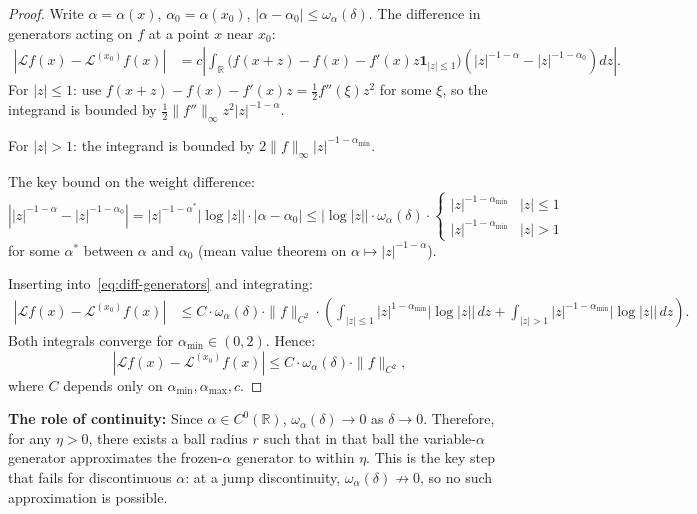 \documentclass{amsart}
\theoremstyle{definition}
\begin{document}
\begin{proof}
Write $\alpha = \alpha(x)$, $\alpha_0 = \alpha(x_0)$, $|\alpha - \alpha_0| \leq \omega_\alpha(\delta)$.
The difference in generators acting on $f$ at a point $x$ near $x_0$:
\begin{align}
    \left|\mathcal{L} f(x) - \mathcal{L}^{(x_0)} f(x)\right|
    &= c \left|\int_\mathbb{R} \bigl(f(x+z)-f(x)-f'(x)z\mathbf{1}_{|z|\leq 1}\bigr)
       \left(|z|^{-1-\alpha} - |z|^{-1-\alpha_0}\right)dz\right|.
    \label{eq:diff-generators}
\end{align}
For $|z| \leq 1$: use $f(x+z) - f(x) - f'(x)z = \frac{1}{2}f''(\xi)z^2$ for some $\xi$,
so the integrand is bounded by $\frac{1}{2}\|f''\|_\infty z^2 |z|^{-1-\alpha}$.

For $|z| > 1$: the integrand is bounded by $2\|f\|_\infty |z|^{-1-\alpha_{\min}}$.

The key bound on the weight difference:
\begin{equation}
    \left||z|^{-1-\alpha} - |z|^{-1-\alpha_0}\right|
    = |z|^{-1-\alpha^*} |\log|z|| \cdot |\alpha - \alpha_0|
    \leq |\log|z|| \cdot \omega_\alpha(\delta) \cdot
    \begin{cases} |z|^{-1-\alpha_{\min}} & |z| \leq 1 \\ |z|^{-1-\alpha_{\min}} & |z| > 1 \end{cases}
\end{equation}
for some $\alpha^*$ between $\alpha$ and $\alpha_0$ (mean value theorem on $\alpha \mapsto |z|^{-1-\alpha}$).

Inserting into~\eqref{eq:diff-generators} and integrating:
\begin{align*}
    \left|\mathcal{L} f(x) - \mathcal{L}^{(x_0)} f(x)\right|
    &\leq C \cdot \omega_\alpha(\delta) \cdot \|f\|_{C^2}
       \cdot \left(\int_{|z|\leq 1} |z|^{1-\alpha_{\min}}|\log|z||\,dz
             + \int_{|z|>1} |z|^{-1-\alpha_{\min}}|\log|z||\,dz\right).
\end{align*}
Both integrals converge for $\alpha_{\min} \in (0,2)$. Hence:
\begin{equation}
    \left|\mathcal{L} f(x) - \mathcal{L}^{(x_0)} f(x)\right|
    \leq C \cdot \omega_\alpha(\delta) \cdot \|f\|_{C^2},
\end{equation}
where $C$ depends only on $\alpha_{\min}, \alpha_{\max}, c$.
\end{proof}

\textbf{The role of continuity:} Since $\alpha \in C^0(\mathbb{R})$,
$\omega_\alpha(\delta) \to 0$ as $\delta \to 0$. Therefore, for any $\eta > 0$,
there exists a ball radius $r$ such that in that ball the variable-$\alpha$ generator
approximates the frozen-$\alpha$ generator to within $\eta$. This is the key step
that fails for discontinuous $\alpha$: at a jump discontinuity, $\omega_\alpha(\delta)
\not\to 0$, so no such approximation is possible.
\end{document}
